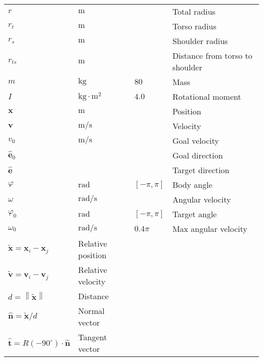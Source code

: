 
\begin{table}[H]
\begin{tabularx}{1.0\linewidth}{ l l l l }
\hline
\hline
$ r $                    & $ \mathrm{m} $ &  & Total radius \\
$ r_{t} $                & $ \mathrm{m} $ &  & Torso radius \\
$ r_{s} $                & $ \mathrm{m} $ &  & Shoulder radius \\
$ r_{ts} $                & $ \mathrm{m} $ &  & Distance from torso to shoulder \\
$ m $                    & $ \mathrm{kg} $ & $ 80 $ & Mass \\
$ I $                    & $ \mathrm{kg \cdot m^{2}} $ & $ 4.0 $ & Rotational moment \\
\hline
\hline
$ \mathbf{x} $           & $ \mathrm{m} $ &  & Position \\
$ \mathbf{v} $           & $ \mathrm{m} / \mathrm{s} $ &  & Velocity \\
$ v_{0} $                & $ \mathrm{m} / \mathrm{s} $ &  & Goal velocity \\  
$ \hat{\mathbf{e}}_{0} $ &  &  & Goal direction \\
$ \hat{\mathbf{e}} $     &  &  & Target direction \\
\hline
\hline
$ \varphi $              & $ \mathrm{rad} $ & $ [-\pi, \pi] $ & Body angle \\
$ \omega $               & $ \mathrm{rad} / \mathrm{s} $ &  & Angular velocity \\
$ \varphi_{0} $          & $ \mathrm{rad} $ & $ [-\pi, \pi] $ & Target angle \\
$ \omega_{0} $           & $ \mathrm{rad} / \mathrm{s} $ & $ 0.4\pi $ & Max angular velocity \\
\hline
\hline
$ \tilde{\mathbf{x}} = \mathbf{x}_{i} - \mathbf{x}_{j} $ & Relative position &&  \\
$ \tilde{\mathbf{v}} = \mathbf{v}_{i} - \mathbf{v}_{j} $ & Relative velocity && \\
$ d = \left\|\tilde{\mathbf{x}}\right\| $ & Distance && \\
$ \hat{\mathbf{n}} = \tilde{\mathbf{x}} / d $ & Normal vector && \\
$ \hat{\mathbf{t}} = R(-90^{\circ}) \cdot \hat{\mathbf{n}} $ & Tangent vector && \\
\hline
\hline
\end{tabularx}
\end{table}
